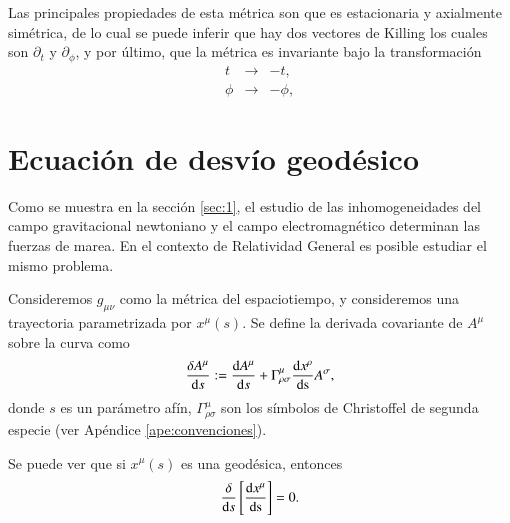Las principales propiedades de esta métrica son que es estacionaria y axialmente simétrica, de lo cual se puede inferir que hay dos vectores de Killing los cuales son $\partial_t$ y $\partial_{\phi}$, y por último, que la métrica es invariante bajo la transformación
\begin{eqnarray*}
t &\longrightarrow & -t ,\\
\phi &\longrightarrow & -\phi,
\end{eqnarray*} 

\section{Ecuación de desvío geodésico}

Como se muestra en la sección \ref{sec:1}, el estudio de las inhomogeneidades del campo gravitacional newtoniano y el campo electromagnético determinan las fuerzas de marea. En el contexto de Relatividad General es posible estudiar el mismo problema.

Consideremos $g_{\mu \nu}$ como la métrica del espaciotiempo, y consideremos una trayectoria parametrizada por $x^{\mu}(s)$. Se define la derivada covariante de $A^{\mu}$ sobre la curva como
\begin{equation}
\label{eq:9}
\frac{\delta A^{\mu}}{\mathrm{d}s} := \dv{A^{\mu}}{s} + \Gamma^{\mu}_{\rho \sigma} \dv{x^{\rho}}{ \mathrm{s} } A^{\sigma},
\end{equation}
donde $s$ es un parámetro afín, $\Gamma^{\mu}_{\rho \sigma}$ son los símbolos de Christoffel de segunda especie (ver Apéndice \ref{ape:convenciones}). 

Se puede ver que si $x^{\mu}(s)$ es una geodésica, entonces
\begin{equation}
\frac{\delta  }{\mathrm{d}s} \left[ \dv{x^{\mu}}{ \mathrm{s} } \right] = 0.
\end{equation} 

